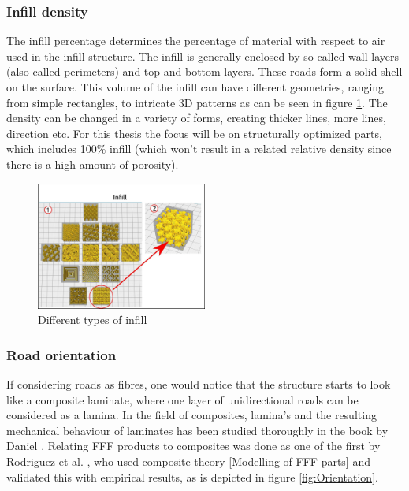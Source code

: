 \subsubsection{Infill density}
The infill percentage determines the percentage of material with respect to air used in the infill structure. The infill is generally enclosed by so called wall layers (also called perimeters) and top and bottom layers. These roads form a solid shell on the surface. This volume of the infill can have different geometries, ranging from simple rectangles, to intricate 3D patterns as can be seen in figure \ref{fig:Infill}. The density can be changed in a variety of forms, creating thicker lines, more lines, direction etc. For this thesis the focus will be on structurally optimized parts, which includes 100\% infill (which won't result in a related relative density since there is a high amount of porosity).

\begin{figure}[H]
    \centering
    \includegraphics[width=0.5\textwidth]{chapter_2/figures/Infillbetter.jpg}
    \caption{Different types of infill \cite{UltimakerSpeed}}
    \label{fig:Infill}
\end{figure}

\subsubsection{Road orientation}
If considering roads as fibres, one would notice that the structure starts to look like a composite laminate, where one layer of unidirectional roads can be considered as a lamina. In the field of composites, lamina's and the resulting mechanical behaviour of laminates has been studied thoroughly in the book by Daniel \cite{Daniel2006EngineeringMaterials}.
Relating FFF products to composites was done as one of the first by Rodriguez et al. \cite{Rodriguez2003MechanicalModeling}, who used composite theory \ref{Modelling of FFF parts} and validated this with empirical results, as is depicted in figure \ref{fig:Orientation}.

